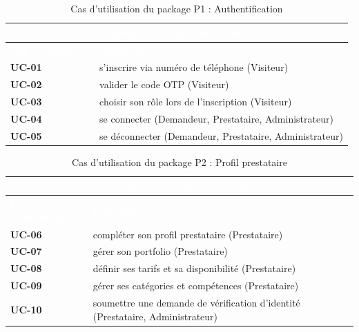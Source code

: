 \begin{table}[H]
	\caption{Cas d'utilisation du package P1 : Authentification}
	\label{tab:cu_p1}
	\centering
	\begin{tabular}{|p{3cm}|p{10.5cm}|}
		\hline
		\multicolumn{2}{|c|}{\cellcolor{vertCongo}\textcolor{white}{\textbf{Package P1 : Authentification}}} \\
		\hline
		\rowcolor{vertCongo}
		\textcolor{white}{\textbf{Cas d'utilisation}} & \textcolor{white}{\textbf{Définition}} \\
		\hline
		\textbf{UC-01} & s'inscrire via numéro de téléphone (Visiteur) \\
		\hline
		\textbf{UC-02} & valider le code OTP (Visiteur) \\
		\hline
		\textbf{UC-03} & choisir son rôle lors de l'inscription (Visiteur) \\
		\hline
		\textbf{UC-04} & se connecter (Demandeur, Prestataire, Administrateur) \\
		\hline
		\textbf{UC-05} & se déconnecter (Demandeur, Prestataire, Administrateur) \\
		\hline
	\end{tabular}
\end{table}


\begin{table}[H]
	\caption{Cas d'utilisation du package P2 : Profil prestataire}
	\label{tab:cu_p2}
	\centering
	\begin{tabular}{|p{3cm}|p{10.5cm}|}
		\hline
		\multicolumn{2}{|c|}{\cellcolor{vertCongo}\textcolor{white}{\textbf{Package P2 : Profil prestataire}}} \\
		\hline
		\rowcolor{vertCongo}
		\textcolor{white}{\textbf{Cas d'utilisation}} & \textcolor{white}{\textbf{Définition}} \\
		\hline
		\textbf{UC-06} & compléter son profil prestataire (Prestataire) \\
		\hline
		\textbf{UC-07} & gérer son portfolio (Prestataire) \\
		\hline
		\textbf{UC-08} & définir ses tarifs et sa disponibilité (Prestataire) \\
		\hline
		\textbf{UC-09} & gérer ses catégories et compétences (Prestataire) \\
		\hline
		\textbf{UC-10} & soumettre une demande de vérification d'identité (Prestataire, Administrateur) \\
		\hline
	\end{tabular}
\end{table}

